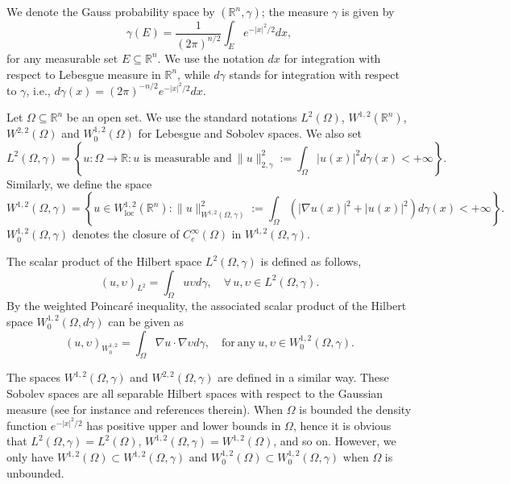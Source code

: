 \documentclass[12pt]{amsart}
\newcommand{\R}{\mathbb R}
\newcommand{\1}{\mathbf 1}
\begin{document}
We denote the Gauss probability space by $( \mathbb{R}^{n}, \gamma)$; the measure $\gamma$ is given by
$$
\gamma(E)= \frac{1}{(2\pi)^{n/2}} \int_{E} e^{-|x|^2/2} dx,
$$
for any measurable set $E\subseteq \mathbb{R}^{n}$. We use the notation $dx$ for integration with respect to Lebesgue measure in $\R^n$, while $d\gamma$ stands for integration with respect to $\gamma$, i.e., $d\gamma(x)=(2\pi)^{-n/2} e^{-|x|^2/2}dx$.

Let $\Omega\subseteq \R^n$ be an open set. We use the standard notations $L^2(\Omega)$, $W^{1,2}(\R^n)$, $W^{2,2}(\Omega)$ and $W^{1,2}_0(\Omega)$ for Lebesgue and Sobolev spaces. We also set
\begin{equation}\nonumber
L^2(\Omega,\gamma)=\left\{u:\Omega\rightarrow \R\colon \mbox{$u$ is measurable and}\ \|u\|^{2}_{2,\gamma}:=\int_{\Omega} |u(x)|^2 d\gamma(x) <+\infty \right\}.
\end{equation}
Similarly, we define the space
\begin{equation}\nonumber
W^{1,2}(\Omega,\gamma)=\left\{u\in W_{\text{loc}}^{1,2}(\R^n)\colon\|u\|^2_{W^{1,2}(\Omega,\gamma)}:=\int_{\Omega}\left(|\nabla u(x)|^{2} +|u(x)|^2\right) d\gamma (x)<+\infty \right\}.
\end{equation}
$W^{1,2}_0(\Omega,\gamma)$ denotes the closure of $C^\infty_c(\Omega)$ in $W^{1,2}(\Omega,\gamma)$.

The scalar product of the Hilbert space $L^2(\Omega,\gamma)$ is defined as follows,
\begin{equation}
(u,\upsilon)_{L^2}=\int_{\Omega}u\upsilon d\gamma,\quad \forall\, u,\upsilon\in L^2(\Omega,\gamma).
\end{equation}
By the weighted Poincar\'{e} inequality, the associated scalar product of the Hilbert space $W^{1,2}_0(\Omega,d\gamma)$ can be given as
\[
(u,\upsilon)_{W_0^{1,2}}=\int_{\Omega}\nabla u\cdot \nabla \upsilon d\gamma,\quad \mathrm{for\ any}\ u,\upsilon\in W^{1,2}_0(\Omega,\gamma).
\]

The spaces $W^{1,2}(\Omega,\gamma)$ and $W^{2,2}(\Omega,\gamma)$ are defined in a similar way. These Sobolev spaces are all separable Hilbert spaces with respect to the Gaussian measure (see for instance \cite{Tero1994,Radulescu2019} and references therein). When $\Omega$ is bounded the density function $e^{-|x|^2/2}$ has positive upper and lower bounds in $\Omega$, hence it is obvious that $L^2(\Omega,\gamma)=L^2(\Omega)$, $W^{1,2}(\Omega,\gamma)=W^{1,2}(\Omega)$, and so on. However, we only have $W^{1,2}(\Omega)\subset W^{1,2}(\Omega,\gamma)$ and $W^{1,2}_0(\Omega)\subset W^{1,2}_0(\Omega,\gamma)$ when $\Omega$ is unbounded.
\end{document}
